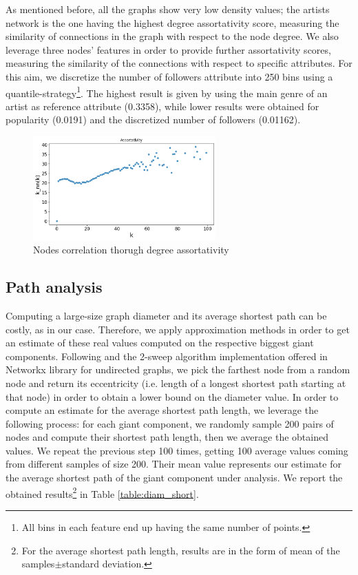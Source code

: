 \documentclass[sigchi]{acmart}
\begin{document}
As mentioned before, all the graphs show very low density values; the artists network is the one having the highest degree assortativity score, measuring the similarity of connections in the graph with respect to the node degree. We also leverage three nodes' features in order to provide further assortativity scores, measuring the similarity of the connections with respect to specific attributes. For this aim, we discretize the number of followers attribute into 250 bins using a quantile-strategy\footnote{All bins in each feature end up having the same number of points.}. The highest result is given by using the main genre of an artist as reference attribute (0.3358), while lower results were obtained for popularity (0.0191) and the discretized number of followers (0.01162).

\begin{figure}[H]
\centering
\includegraphics[width=7cm]{img/degree_assortativty.png}
\caption{Nodes correlation thorugh degree assortativity}
\label{fig: clust_distr}
\end{figure}

\subsection{Path analysis}
Computing a large-size graph diameter and its average shortest path can be costly, as in our case. Therefore, we apply approximation methods in order to get an estimate of these real values computed on the respective biggest giant components. Following \cite{diam_app} and the 2-sweep algorithm implementation offered in Networkx library for undirected graphs, we pick the farthest node from a random node and return its eccentricity (i.e. length of a longest shortest path starting at that node) in order to obtain a lower bound on the diameter value. In order to compute an estimate for the average shortest path length, we leverage the following process: for each giant component, we randomly sample 200 pairs of nodes and compute their shortest path length, then we average the obtained values. We repeat the previous step 100 times, getting 100 average values coming from different samples of size 200. Their mean value represents our estimate for the average shortest path of the giant component under analysis. We report the obtained results\footnote{For the average shortest path length, results are in the form of mean of the samples$\pm$standard deviation.} in Table \ref{table:diam_short}.
\end{document}
